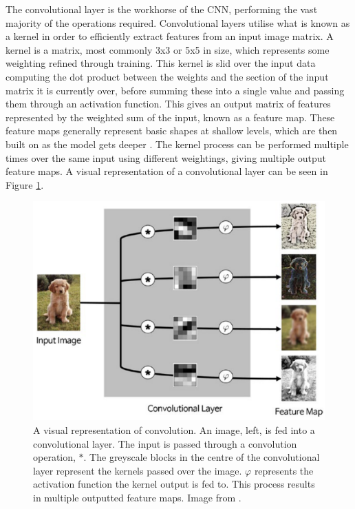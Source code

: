 The convolutional layer is the workhorse of the CNN, performing the vast majority of the operations required. Convolutional layers utilise what is known as a kernel in order to efficiently extract features from an input image matrix. A kernel is a matrix, most commonly 3x3 or 5x5 in size, which represents some weighting refined through training. This kernel is slid over the input data computing the dot product between the weights and the section of the input matrix it is currently over, before summing these into a single value and passing them through an activation function. This gives an output matrix of features represented by the weighted sum of the input, known as a feature map. These feature maps generally represent basic shapes at shallow levels, which are then built on as the model gets deeper \cite{kim_convolutional_2017}. The kernel process can be performed multiple times over the same input using different weightings, giving multiple output feature maps. A visual representation of a convolutional layer can be seen in Figure \ref{fig:convolution}.

\begin{figure}
	\begin{center}
		\includegraphics[width=0.6\linewidth]{Chapter2/figs/convolution.png}
	\end{center}
	\caption[A visual representation of convolution.]{A visual representation of convolution. An image, left, is fed into a convolutional layer. The input is passed through a convolution operation, $*$. The greyscale blocks in the centre of the convolutional layer represent the kernels passed over the image. $\varphi$ represents the activation function the kernel output is fed to. This process results in multiple outputted feature maps. Image from \cite{kim_convolutional_2017}.}
	\label{fig:convolution}
\end{figure}

